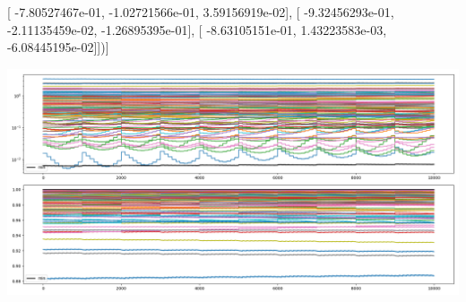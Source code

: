 \documentclass{article}
\begin{document}
       [ -7.80527467e-01,  -1.02721566e-01,   3.59156919e-02],
       [ -9.32456293e-01,  -2.11135459e-02,  -1.26895395e-01],
       [ -8.63105151e-01,   1.43223583e-03,  -6.08445195e-02]])]
\begin{center}
\includegraphics[scale=.9]{report_pickled_controls40/control_dpn_all}

\end{center}
\end{document}
